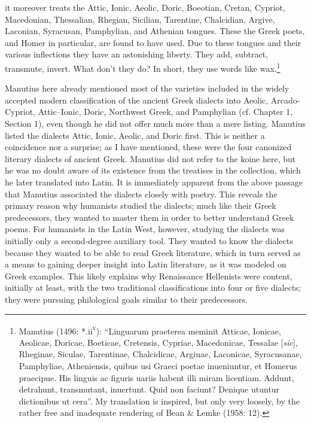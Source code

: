\documentclass[12pt]{article}
\newenvironment{styleStandard}{\renewcommand\baselinestretch{1.25}\setlength\leftskip{0in}\setlength\rightskip{0in}\setlength\parindent{0.1972in}\setlength\parfillskip{0pt plus 1fil}\setlength\parskip{0in plus 1pt}\writerlistparindent\writerlistleftskip\leavevmode\normalfont\normalsize\writerlistlabel\ignorespaces}{\unskip\vspace{0in plus 1pt}\par}
\newenvironment{styleQuote}{\renewcommand\baselinestretch{1.25}\setlength\leftskip{0.3937in}\setlength\rightskip{0in}\setlength\parindent{0in}\setlength\parfillskip{0pt plus 1fil}\setlength\parskip{0.1665in plus 0.016649999in}\writerlistparindent\writerlistleftskip\leavevmode\normalfont\normalsize\writerlistlabel\ignorespaces}{\unskip\vspace{0.1665in plus 0.016649999in}\par}
\newcommand\writerlistleftskip{}
\newcommand\writerlistparindent{}
\newcommand\writerlistlabel{}
\begin{document}
\begin{styleQuote}
it moreover treats the Attic, Ionic, Aeolic, Doric, Boeotian, Cretan, Cypriot, Macedonian, Thessalian, Rhegian, Sicilian, Tarentine, Chalcidian, Argive, Laconian, Syracusan, Pamphylian, and Athenian tongues. These the Greek poets, and Homer in particular, are found to have used. Due to these tongues and their various inflections they have an astonishing liberty. They add, subtract, transmute, invert. What don’t they do? In short, they use words like wax.\footnote{ Manutius (1496: *.ii\textsc{\textsuperscript{v}}): “Linguarum praeterea meminit Atticae, Ionicae, Aeolicae, Doricae, Boeticae, Cretensis, Cypriae, Macedonicae, Tessalae [\textit{sic}], Rheginae, Siculae, Tarentinae, Chalcidicae, Argiuae, Laconicae, Syracusanae, Pamphyliae, Atheniensis, quibus usi Graeci poetae inueniuntur, et Homerus praecipue. His linguis ac figuris uariis habent illi miram licentiam. Addunt, detrahunt, transmutant, inuertunt. Quid non faciunt? Denique utuntur dictionibus ut cera”. My translation is inspired, but only very loosely, by the rather free and inadequate rendering of Bean \& Lemke (1958: 12).}
\end{styleQuote}

\begin{styleStandard}
Manutius here already mentioned most of the varieties included in the widely accepted modern classification of the ancient Greek dialects into Aeolic, Arcado-Cypriot, Attic–Ionic, Doric, Northwest Greek, and Pamphylian (cf. Chapter 1, Section 1), even though he did not offer much more than a mere listing. Manutius listed the dialects Attic, Ionic, Aeolic, and Doric first. This is neither a coincidence nor a surprise; as I have mentioned, these were the four canonized literary dialects of ancient Greek. Manutius did not refer to the koine here, but he was no doubt aware of its existence from the treatises in the collection, which he later translated into Latin. It is immediately apparent from the above passage that Manutius associated the dialects closely with poetry. This reveals the primary reason why humanists studied the dialects; much like their Greek predecessors, they wanted to master them in order to better understand Greek poems. For humanists in the Latin West, however, studying the dialects was initially only a second-degree auxiliary tool. They wanted to know the dialects because they wanted to be able to read Greek literature, which in turn served as a means to gaining deeper insight into Latin literature, as it was modeled on Greek examples. This likely explains why Renaissance Hellenists were content, initially at least, with the two traditional classifications into four or five dialects; they were pursuing philological goals similar to their predecessors.
\end{styleStandard}
\end{document}
